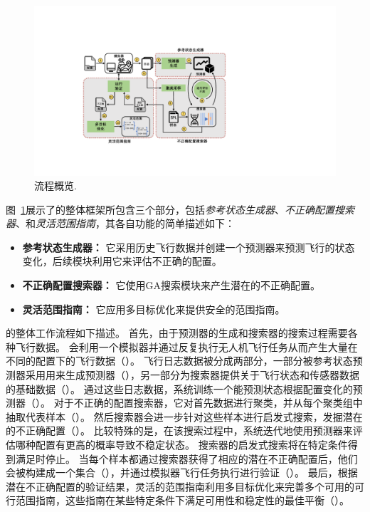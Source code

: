 \begin{figure}[ht]
  \centering
    \includegraphics[width=\columnwidth]{fig/range/range_overview.pdf}
\caption{\icsearcher 流程概览.}
\label{fig:range_overview} 
\end{figure}

图~\ref{fig:range_overview}展示了\icsearcher 的整体框架所包含三个部分，包括\emph{参考状态生成器}、\emph{不正确配置搜索器}、和\emph{灵活范围指南}，其各自功能的简单描述如下：

\begin{itemize}
\item \textbf{参考状态生成器：} 它采用历史飞行数据并创建一个预测器来预测飞行的状态变化，后续模块利用它来评估不正确的配置。
\item \textbf{不正确配置搜索器：} 它使用GA搜索模块来产生潜在的不正确配置。

\item \textbf{灵活范围指南：} 它应用多目标优化来提供安全的范围指南。

\end{itemize}

\icsearcher 的整体工作流程如下描述。
首先，由于预测器的生成和搜索器的搜索过程需要各种飞行数据。
\icsearcher 会利用一个模拟器并通过反复执行无人机飞行任务从而产生大量在不同的配置下的飞行数据（）。
飞行日志数据被分成两部分，一部分被参考状态预测器采用用来生成预测器（），另一部分为搜索器提供关于飞行状态和传感器数据的基础数据（）。
通过这些日志数据，系统训练一个能预测状态根据配置变化的预测器（）。
对于不正确的配置搜索器，它对首先数据进行聚类，并从每个聚类组中抽取代表样本（）。
然后搜索器会进一步针对这些样本进行启发式搜索，发掘潜在的不正确配置（）。
比较特殊的是，在该搜索过程中，系统迭代地使用预测器来评估哪种配置有更高的概率导致不稳定状态。
搜索器的启发式搜索将在特定条件得到满足时停止。
当每个样本都通过搜索器获得了相应的潜在不正确配置后，他们会被构建成一个集合（），并通过模拟器飞行任务执行进行验证（）。
最后，根据潜在不正确配置的验证结果，灵活的范围指南利用多目标优化来完善多个可用的可行范围指南，这些指南在某些特定条件下满足可用性和稳定性的最佳平衡（）。


